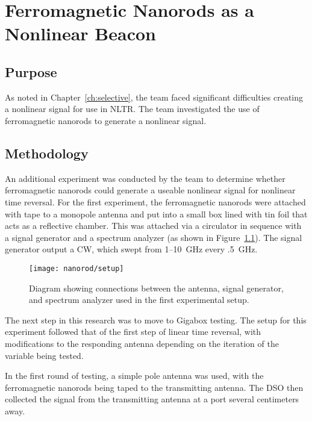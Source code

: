 \chapter{Ferromagnetic Nanorods as a Nonlinear Beacon}

\label{ch:nanorod}

\section{Purpose}

As noted in Chapter~\ref{ch:selective}, the team faced significant difficulties creating a nonlinear signal for use in NLTR.  The team investigated the use of ferromagnetic nanorods to generate a nonlinear signal.

\section{Methodology}
\label{sec:nanorod-meth}

An additional experiment was conducted by the team to determine whether ferromagnetic nanorods could generate a useable nonlinear signal for nonlinear time reversal. For the first experiment, the ferromagnetic nanorods were attached with tape to a monopole antenna and put into a small box lined with tin foil that acts as a reflective chamber. This was attached via a circulator in sequence with a signal generator and a spectrum analyzer (as shown in Figure~\ref{fig:nanorod-setup}). The signal generator output a CW, which swept from \numrange{1}{10}~GHz every .5~GHz.

\begin{figure}[h!]
\centering
\texttt{[image: nanorod/setup]}
    \caption[Initial ferromagnetic nanorod experimental setup]{Diagram showing connections between the antenna, signal generator, and spectrum analyzer used in the first experimental setup.}
    \label{fig:nanorod-setup}
\end{figure}

The next step in this research was to move to Gigabox testing. The setup for this experiment followed that of the first step of linear time reversal, with modifications to the responding antenna depending on the iteration of the variable being tested.

In the first round of testing, a simple pole antenna was used, with the ferromagnetic nanorods being taped to the transmitting antenna. The DSO then collected the signal from the transmitting antenna at a port several centimeters away.

